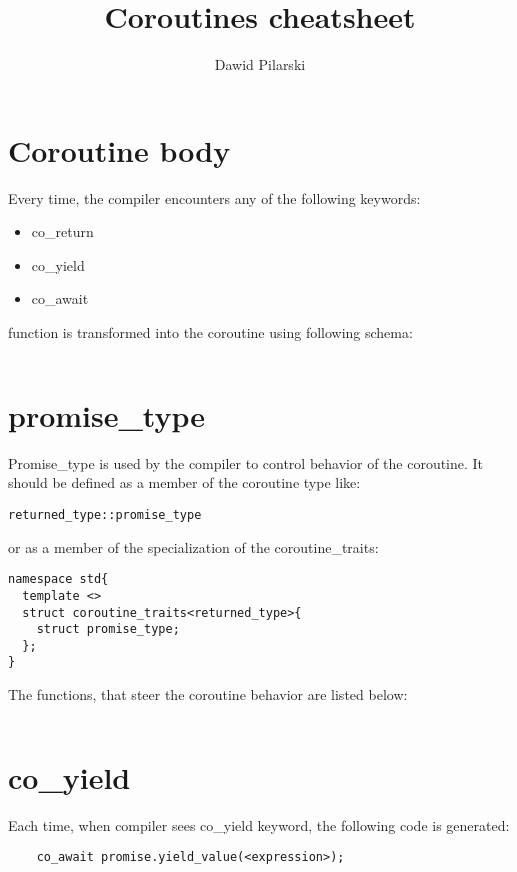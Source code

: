 \documentclass[twoside,twocolumn, 10pt]{article}
\author{Dawid Pilarski}
\date{}
\title{Coroutines cheatsheet}
\begin{document}
\pagebreak[0]
\section{Coroutine body}

Every time, the compiler encounters any of the following
keywords: 
\begin{itemize}
	\item co\_return
	\item co\_yield
	\item co\_await
\end{itemize}

function is transformed into the coroutine using following schema:

\begin{listing}
\inputminted{c++}{code-examples/theory-custom-coroutine/coroutine-body.cpp}
\end{listing}

\pagebreak[0]
\section{promise\_type}

Promise\_type is used by the compiler to control behavior of the coroutine.
It should be defined as a member of the coroutine type like:

\begin{verbatim}
returned_type::promise_type
\end{verbatim}

or as a member of the specialization of the coroutine\_traits:

\begin{verbatim}
namespace std{
  template <> 
  struct coroutine_traits<returned_type>{
    struct promise_type;
  };
}
\end{verbatim}

The functions, that steer the coroutine behavior are listed below:

\inputminted{c++}{code-examples/theory-custom-coroutine/promise-type.hpp}

\pagebreak[0]
\section{co\_yield}
	Each time, when compiler sees co\_yield keyword, the following
	code is generated:

\begin{verbatim}
	co_await promise.yield_value(<expression>);
\end{verbatim}
\end{document}
